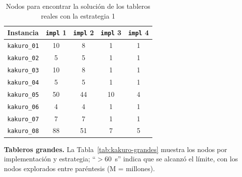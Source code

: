 \begin{table}[htbp]
    \caption{Nodos para encontrar la solución de los tableros reales con la estrategia 1}
    \label{tab:kakuro-reales}
    \begin{tabular}{@{}lcccc@{}}
        \toprule
        Instancia            & \texttt{impl} 1 & \texttt{impl} 2 & \texttt{impl} 3 & \texttt{impl} 4 \\
        \midrule
        \texttt{kakuro\_01} & 10              & 8               & 1               & 1               \\
        \texttt{kakuro\_02} & 5               & 5               & 1               & 1               \\
        \texttt{kakuro\_03} & 10              & 8               & 1               & 1               \\
        \texttt{kakuro\_04} & 5               & 5               & 1               & 1               \\
        \texttt{kakuro\_05} & 50              & 44              & 10              & 4               \\
        \texttt{kakuro\_06} & 4               & 4               & 1               & 1               \\
        \texttt{kakuro\_07} & 7               & 7               & 1               & 1               \\
        \texttt{kakuro\_08} & 88              & 51              & 7               & 5               \\
        \bottomrule
    \end{tabular}
\end{table}

\textbf{Tableros grandes.} La Tabla~\ref{tab:kakuro-grandes} muestra los nodos por implementación y estrategia; \enquote{$>60$~s} indica que se alcanzó el límite, con los nodos explorados entre paréntesis (M = millones).

